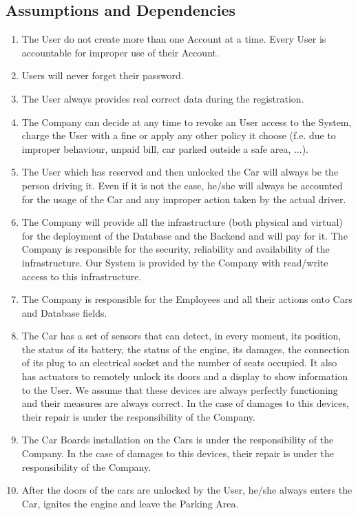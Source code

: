 \subsection{Assumptions and Dependencies}
\begin{enumerate}
	\item The User do not create more than one Account at a time. Every User is accountable for improper use of their Account.
	\item Users will never forget their password.
	\item The User always provides real correct data during the registration. 	
	\item The Company can decide at any time to revoke an User access to the System, charge the User with a fine or apply any other policy it choose (f.e. due to improper behaviour, unpaid bill, car parked outside a safe area, ...).
	\item The User which has reserved and then unlocked the Car will always be the person driving it. Even if it is not the case, he/she will always be accounted for the usage of the Car and any improper action taken by the actual driver. 
	\item The Company will provide all the infrastructure (both physical and virtual) for the deployment of the Database and the Backend and will pay for it. The Company is responsible for the security, reliability and availability of the infrastructure. Our System is provided by the Company with read/write access to this infrastructure.
	\item The Company is responsible for the Employees and all their actions onto Cars and Database fields.
	\item The Car has a set of sensors that can detect, in every moment, its position, the status of its battery, the status of the engine, its damages, the connection of its plug to an electrical socket and the number of seats occupied. It also has actuators to remotely unlock its doors and a display to show information to the User. We assume that these devices are always perfectly functioning and their measures are always correct. In the case of damages to this devices, their repair is under the responsibility of the Company.
	\item The Car Boards installation on the Cars is under the responsibility of the Company. In the case of damages to this devices, their repair is under the responsibility of the Company.
	\item After the doors of the cars are unlocked by the User, he/she always enters the Car, ignites the engine and leave the Parking Area.

\end{enumerate}
